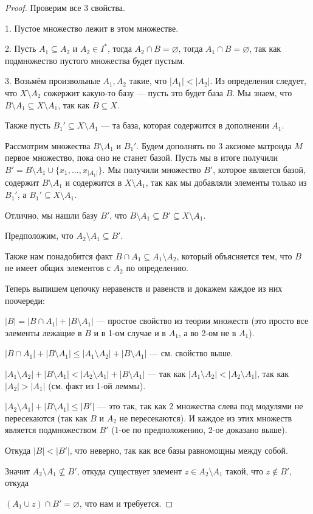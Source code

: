 \documentclass[a4paper, 12pt]{article}
\begin{document}
\begin{proof}

Проверим все 3 свойства.

1. Пустое множество лежит в этом множестве.

2. Пусть $A_1 \subseteq A_2$ и $A_2 \in I^*$, тогда $A_2 \cap B = \varnothing$,
тогда $A_1 \cap B = \varnothing$, так как подмножество пустого множества будет
пустым.

3. Возьмём произвольные $A_1, A_2$ такие, что $|A_1| < |A_2|$. Из определения
следует, что $X \setminus A_2$ сожержит какую-то базу --- пусть это будет база 
$B$. Мы знаем, что $B \setminus A_1 \subseteq X \setminus A_1$, так как $B \subseteq X$.

Также пусть $B_1' \subseteq X \setminus A_1$ --- та база, которая содержится в
дополнении $A_1$. 

Рассмотрим множества $B \setminus A_1$ и $B_1'$. Будем дополнять по 3 аксиоме
матроида $M$ первое множество, пока оно не станет базой. Пусть мы в итоге
получили $B' = B \setminus A_1 \cup \{x_1, \ldots, x_{|A_1|}\}$. Мы получили
множество $B'$, которое является базой, содержит $B \setminus A_1$ и содержится
в $X \setminus A_1$, так как мы добавляли элементы только из $B_1'$, а $B_1' \subseteq X \setminus A_1$.

Отлично, мы нашли базу $B'$, что $B \setminus A_1\subseteq B' \subseteq X \setminus A_1$.

Предположим, что $A_2 \setminus A_1 \subseteq B'$.

Также нам понадобится факт $B \cap A_1 \subseteq A_1 \setminus A_2$, который 
объясняется тем, что $B$ не имеет общих элементов с $A_2$ по определению.

Теперь выпишем цепочку неравенств и равенств и докажем каждое из них поочереди:

$|B| = |B \cap A_1| + |B \setminus A_1|$ --- простое свойство из теории множеств
(это просто все элементы лежащие в $B$ и в 1-ом случае и в $A_1$, а во 2-ом не в $A_1$).

$|B \cap A_1| + |B \setminus A_1| \leqslant |A_1 \setminus A_2| + |B \setminus A_1|$ ---
см. свойство выше.

$|A_1 \setminus A_2| + |B \setminus A_1| < |A_2 \setminus A_1| + |B \setminus A_1|$ ---
так как $|A_1 \setminus A_2|<|A_2 \setminus A_1|$, так как $|A_2| > |A_1|$ (см. факт
из 1-ой леммы).

$|A_2 \setminus A_1| + |B \setminus A_1| \leqslant |B'|$ --- это так, так как 2
множества слева под модулями не пересекаются (так как $B$ и $A_2$ не пересекаются).
И каждое из этих множеств является подмножеством $B'$ (1-ое по предположению, 2-ое
доказано выше).

Откуда $|B| < |B'|$, что неверно, так как все базы равномощны между собой.

Значит $A_2 \setminus A_1 \not\subseteq B'$, откуда существует элемент $z \in
A_2 \setminus A_1$ такой, что $z \not\in B'$, откуда 

\noindent$(A_1 \cup z) \cap B' = \varnothing$,
что нам и требуется.

\end{proof}
\end{document}
